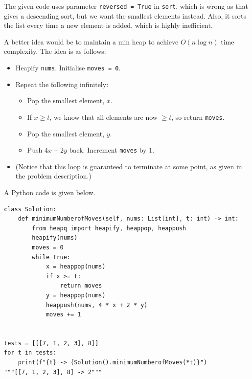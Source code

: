 \documentclass[12pt]{article}
\renewcommand{\t}{\texttt}
\begin{document}
The given code uses parameter \t{reversed = True} in \t{sort}, which is wrong as that gives a descending sort, but we want the smallest elements instead. Also, it sorts the list every time a new element is added, which is highly inefficient.

A better idea would be to maintain a min heap to achieve $O(n\log n)$ time complexity. The idea is as follows:
\begin{itemize}
\item Heapify \t{nums}. Initialise \t{moves = 0}.
\item Repeat the following infinitely:
\begin{itemize}
\item Pop the smallest element, $x$.
\item If $x\ge t$, we know that all elements are now $\ge t$, so return \t{moves}.
\item Pop the smallest element, $y$.
\item Push $4x+2y$ back. Increment \t{moves} by $1$.
\end{itemize}
\item (Notice that this loop is guaranteed to terminate at some point, as given in the problem description.)
\end{itemize}

A Python code is given below.
\begin{verbatim}
class Solution:
    def minimumNumberofMoves(self, nums: List[int], t: int) -> int:
        from heapq import heapify, heappop, heappush
        heapify(nums)
        moves = 0
        while True:
            x = heappop(nums)
            if x >= t:
                return moves
            y = heappop(nums)
            heappush(nums, 4 * x + 2 * y)
            moves += 1


tests = [[[7, 1, 2, 3], 8]]
for t in tests:
    print(f"{t} -> {Solution().minimumNumberofMoves(*t)}")
"""[[7, 1, 2, 3], 8] -> 2"""
\end{verbatim}
\end{document}
